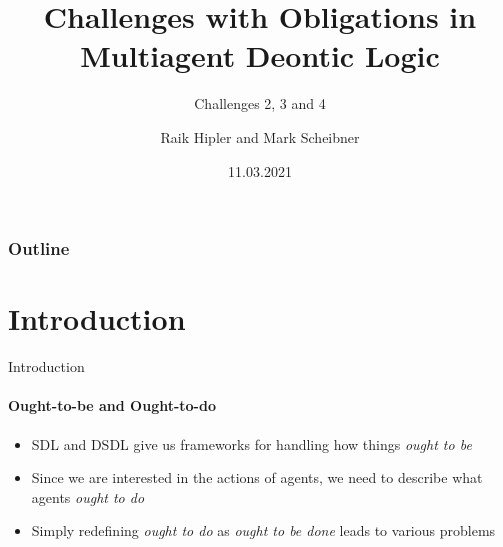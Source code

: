 \documentclass[usenames,dvipsnames]{beamer}
\title{Challenges with Obligations in Multiagent Deontic Logic}
\subtitle{Challenges 2, 3 and 4}
\author{Raik Hipler and Mark Scheibner}
\date{11.03.2021}
\begin{document}
    \begingroup
    \makeatletter
    \setlength{\hoffset}{.5\beamer@sidebarwidth}
    \makeatother
    \frame[plain]{\titlepage}
    \endgroup
	
	\begin{frame}[plain]
		\frametitle{Outline}
		\tableofcontents
	\end{frame}
    
    \section{Introduction}
	\begin{frame}{Introduction}
		\framesubtitle{Ought-to-be and Ought-to-do}
		\begin{itemize}
		    \item SDL and DSDL give us frameworks for handling how things \emph{ought to be}
		    \item Since we are interested in the actions of agents, we need to describe what agents \emph{ought to do}
		    \item Simply redefining \emph{ought to do} as \emph{ought to be done} leads to various problems
		\end{itemize}
	\end{frame}
	
\end{document}
